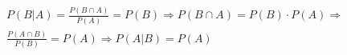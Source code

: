 \item

\[\begin{array}{l}
P(B|A) = \frac{{P(B \cap A)}}{{P(A)}} = P(B) \Rightarrow P(B \cap A) = P(B) \cdot P(A) \Rightarrow \\
\frac{{P(A \cap B)}}{{P(B)}} = P(A) \Rightarrow P(A|B) = P(A)
\end{array}\]